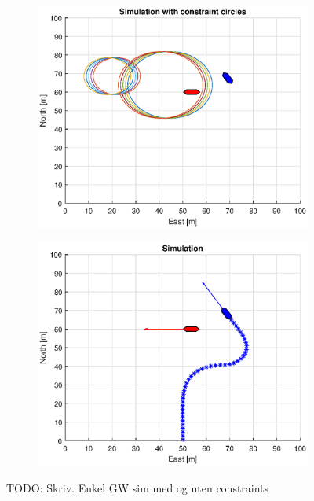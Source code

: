 \begin{figure}[ht]
\begin{subfigure}[b]{0.499\textwidth}
    \end{subfigure}
    \hfill
    \\
    \begin{subfigure}[b]{0.49\textwidth}
        \centering
        \includegraphics[width=\textwidth]{Images/Figures/Enkel_GW/Simple0_f1_Frame5}
    \end{subfigure}
    \hfill
    \begin{subfigure}[b]{0.499\textwidth}
        \centering
        \includegraphics[width=\textwidth]{Images/Figures/Enkel_GW/Simple0_f600_Frame5}
    \end{subfigure}
    \hfill
    \caption{TODO: Skriv. Enkel GW sim med og uten constraints}
\end{figure}

